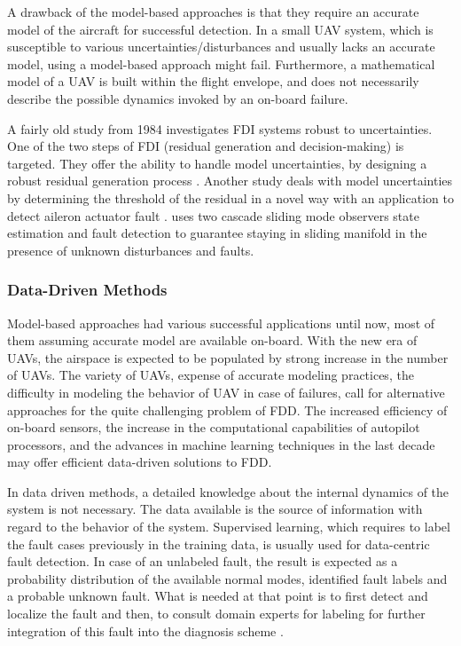 A drawback of the model-based approaches is that they require an accurate model of the 
aircraft for successful detection. In a small UAV system, which is susceptible to various 
uncertainties/disturbances and usually lacks an accurate model, using a model-based approach might fail. 
Furthermore, a mathematical model of a UAV 
is built within the flight envelope, and does not necessarily describe the 
possible dynamics invoked by an on-board failure. 

A fairly old study from 1984 investigates FDI systems robust to 
uncertainties. One of the two steps of FDI (residual generation and decision-making) is targeted. They offer the ability to handle model uncertainties, by designing a robust residual generation process \cite{chow1984analytical}. 
Another study deals with model uncertainties by determining the threshold of the residual 
in a novel way with an application to detect aileron actuator fault \cite{rotstein2006fault}. 
\cite{sharma2007fault} uses two cascade sliding mode observers state estimation and 
fault detection to guarantee staying in sliding manifold in the presence of unknown 
disturbances and faults. 
%

\subsubsection{Data-Driven Methods}

Model-based approaches had various successful applications until now, 
most of them assuming accurate model are available on-board. With the new 
era of UAVs, the airspace is expected to be populated by strong increase 
in the number of UAVs. The variety of UAVs, expense of accurate modeling 
practices, the difficulty in modeling the behavior of UAV in case of failures, 
call for alternative approaches for the quite challenging problem of FDD. 
The increased efficiency of on-board sensors, the increase in the computational 
capabilities of autopilot processors, and the advances in machine learning 
techniques in the last decade may offer efficient data-driven solutions to FDD.

In data driven methods, a detailed knowledge about the internal dynamics 
of the system is not necessary. The data available is the source of information 
with regard to the behavior of the system. Supervised learning, which requires 
to label the fault cases previously in the training data, is usually used for 
data-centric fault detection. In case of an unlabeled fault, the result is 
expected as a probability distribution of the available normal modes, identified 
fault labels and a probable unknown fault. What is needed at that point is to 
first detect and localize the fault and then, to consult domain experts for labeling 
for further integration of this fault into the diagnosis scheme \cite{dataCentricDiagOffline}.

